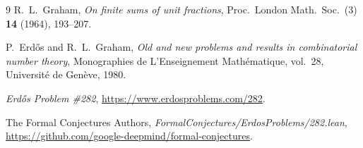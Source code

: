 \documentclass[11pt,a4paper]{amsart}
\theoremstyle{remark}
\begin{document}
\begin{thebibliography}{9}
R.~L.~Graham, \emph{On finite sums of unit fractions}, Proc.\ London Math.\ Soc.\ (3) \textbf{14} (1964), 193--207.

P.~Erd\H{o}s and R.~L.~Graham, \emph{Old and new problems and results in combinatorial number theory}, Monographies de L'Enseignement Math\'ematique, vol.~28, Universit\'e de Gen\`eve, 1980.

\emph{Erd\H{o}s Problem \#282}, \url{https://www.erdosproblems.com/282}.

The Formal Conjectures Authors, \emph{FormalConjectures/ErdosProblems/282.lean},\\ \url{https://github.com/google-deepmind/formal-conjectures}.
\end{thebibliography}
\end{document}
